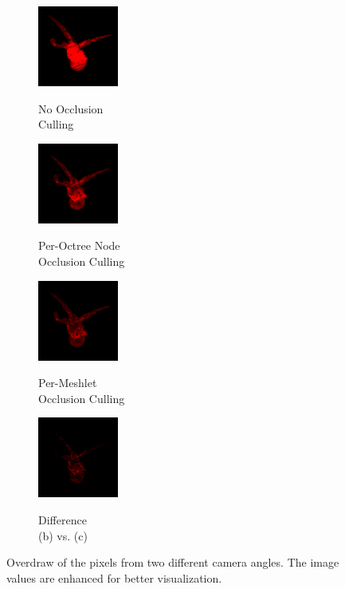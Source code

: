 \begin{figure}[!htb]
  \begin{subfigure}{100px}
    \includegraphics[height=100px]{images/graphics/overdraw-lucy2-nocull.png}
    \caption{}
    \parbox{\linewidth}{\centering\footnotesize No Occlusion\\Culling}
  \end{subfigure}
  \begin{subfigure}{100px}
    \includegraphics[height=100px]{images/graphics/overdraw-lucy2-pooc.png}
    \caption{}
    \parbox{\linewidth}{\centering\footnotesize Per-Octree Node\\Occlusion Culling}
  \end{subfigure}
  \begin{subfigure}{100px}
    \includegraphics[height=100px]{images/graphics/overdraw-lucy2-pmoc.png}
    \caption{}
    \parbox{\linewidth}{\centering\footnotesize Per-Meshlet\\Occlusion Culling}
  \end{subfigure}
  \begin{subfigure}{100px}
    \includegraphics[height=100px]{images/graphics/overdraw-lucy2-diff.png}
    \caption{}
    \parbox{\linewidth}{\centering\footnotesize Difference\\(b) vs. (c)}
  \end{subfigure}

  \caption{Overdraw of the pixels from two different camera angles. 
  The image values are enhanced for better visualization.}
  \label{fig:lucy-overdraw}
\end{figure}

